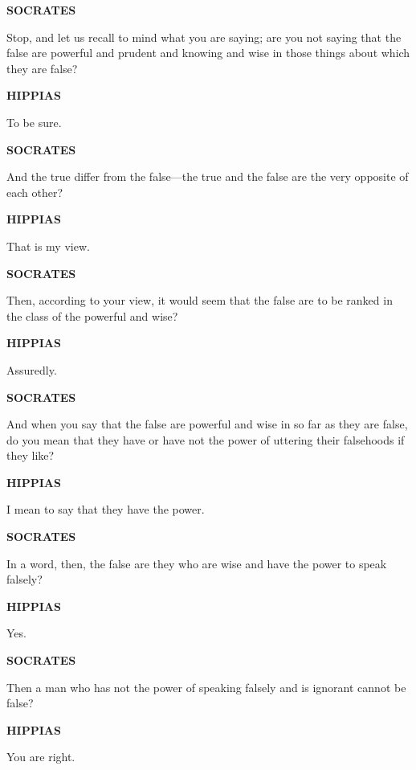 \documentclass[11pt,letter]{article}
\begin{document}
\par \textbf{SOCRATES}
\par   Stop, and let us recall to mind what you are saying; are you not saying that the false are powerful and prudent and knowing and wise in those things about which they are false?

\par \textbf{HIPPIAS}
\par   To be sure.

\par \textbf{SOCRATES}
\par   And the true differ from the false—the true and the false are the very opposite of each other?

\par \textbf{HIPPIAS}
\par   That is my view.

\par \textbf{SOCRATES}
\par   Then, according to your view, it would seem that the false are to be ranked in the class of the powerful and wise?

\par \textbf{HIPPIAS}
\par   Assuredly.

\par \textbf{SOCRATES}
\par   And when you say that the false are powerful and wise in so far as they are false, do you mean that they have or have not the power of uttering their falsehoods if they like?

\par \textbf{HIPPIAS}
\par   I mean to say that they have the power.

\par \textbf{SOCRATES}
\par   In a word, then, the false are they who are wise and have the power to speak falsely?

\par \textbf{HIPPIAS}
\par   Yes.

\par \textbf{SOCRATES}
\par   Then a man who has not the power of speaking falsely and is ignorant cannot be false?

\par \textbf{HIPPIAS}
\par   You are right.
\end{document}
